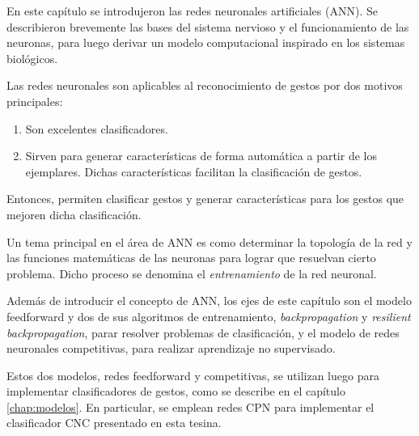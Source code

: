 
En este capítulo se introdujeron las redes neuronales artificiales (ANN). Se describieron brevemente las bases del sistema nervioso y el funcionamiento de las neuronas, para luego derivar un modelo computacional inspirado en los sistemas biológicos. 

Las redes neuronales son aplicables al reconocimiento de gestos por dos motivos principales:

\begin{enumerate}
\item Son excelentes clasificadores. 
\item Sirven para generar características de forma automática a partir de los ejemplares. Dichas características facilitan la clasificación de gestos.
\end{enumerate}

Entonces, permiten clasificar gestos y generar características para los gestos que mejoren dicha clasificación.

Un tema principal en el área de ANN es como determinar la topología de la red y las funciones matemáticas de las neuronas para lograr que resuelvan cierto problema. Dicho proceso se denomina el \textit{entrenamiento} de la red neuronal.

Además de introducir el concepto de ANN, los ejes de este capítulo son el modelo feedforward y dos de sus algoritmos de entrenamiento, \textit{backpropagation} y \textit{resilient backpropagation}, parar resolver problemas de clasificación, y el modelo de redes neuronales competitivas, para realizar aprendizaje no supervisado.

Estos dos modelos, redes feedforward y competitivas, se utilizan luego para implementar clasificadores de gestos, como se describe en el capítulo \ref{chap:modelos}. En particular, se emplean redes CPN para implementar el clasificador CNC presentado en esta tesina.


%
%
%
%

